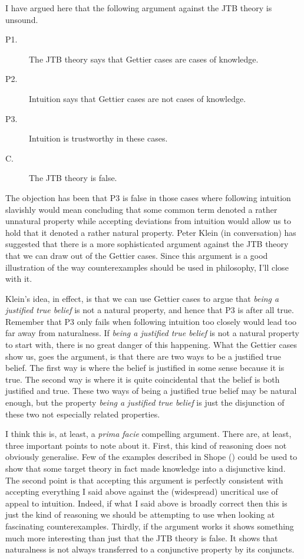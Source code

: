 \documentclass[
  11pt,
  letterpaper,
  DIV=11,
  numbers=noendperiod,
  oneside]{scrartcl}
\begin{document}
I have argued here that the following argument against the JTB theory is
unsound.

\begin{description}
\item[P1.]
The JTB theory says that Gettier cases are cases of knowledge.
\item[P2.]
Intuition says that Gettier cases are not cases of knowledge.
\item[P3.]
Intuition is trustworthy in these cases.
\item[C.]
The JTB theory is false.
\end{description}

The objection has been that P3 is false in those cases where following
intuition slavishly would mean concluding that some common term denoted
a rather unnatural property while accepting deviations from intuition
would allow us to hold that it denoted a rather natural property. Peter
Klein (in conversation) has suggested that there is a more sophisticated
argument against the JTB theory that we can draw out of the Gettier
cases. Since this argument is a good illustration of the way
counterexamples should be used in philosophy, I'll close with it.

Klein's idea, in effect, is that we can use Gettier cases to argue that
\emph{being a justified true belief} is not a natural property, and
hence that P3 is after all true. Remember that P3 only fails when
following intuition too closely would lead too far away from
naturalness. If \emph{being a justified true belief} is not a natural
property to start with, there is no great danger of this happening. What
the Gettier cases show us, goes the argument, is that there are two ways
to be a justified true belief. The first way is where the belief is
justified in some sense because it is true. The second way is where it
is quite coincidental that the belief is both justified and true. These
two ways of being a justified true belief may be natural enough, but the
property \emph{being a justified true belief} is just the disjunction of
these two not especially related properties.

I think this is, at least, a \emph{prima facie} compelling argument.
There are, at least, three important points to note about it. First,
this kind of reasoning does not obviously generalise. Few of the
examples described in Shope () could be
used to show that some target theory in fact made knowledge into a
disjunctive kind. The second point is that accepting this argument is
perfectly consistent with accepting everything I said above against the
(widespread) uncritical use of appeal to intuition. Indeed, if what I
said above is broadly correct then this is just the kind of reasoning we
should be attempting to use when looking at fascinating counterexamples.
Thirdly, if the argument works it shows something much more interesting
than just that the JTB theory is false. It shows that naturalness is not
always transferred to a conjunctive property by its conjuncts.
\end{document}
